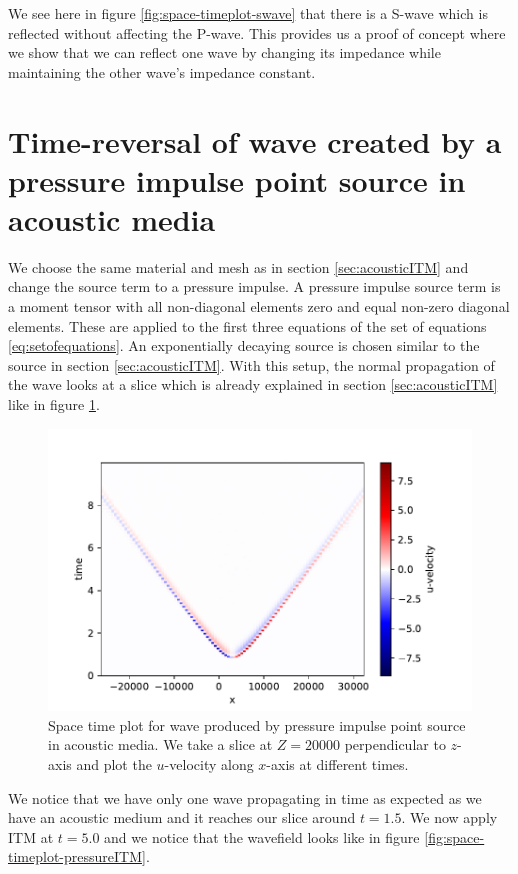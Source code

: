 We see here in figure \ref{fig:space-timeplot-swave} that there is a S-wave which is reflected without affecting the P-wave. 
This provides us a proof of concept where we show that we can reflect one wave by changing its impedance while maintaining the other wave's impedance constant.

\section{Time-reversal of wave created by a pressure impulse point source in acoustic media}\label{sec:pressureimpulse}
We choose the same material and mesh as in section \ref{sec:acousticITM} and change the source term to a pressure impulse. A pressure impulse source term is a moment tensor
with all non-diagonal elements zero and equal non-zero diagonal elements. These are applied to the first three equations of the set of equations \ref{eq:setofequations}. 
An exponentially decaying source is chosen similar to the source in section \ref{sec:acousticITM}. With this setup, the normal propagation of the wave looks at a slice which is already explained in section \ref{sec:acousticITM}
like in figure \ref{fig:space-timeplot-pressurenoITM}.

\begin{figure}[!htpb]
    \centering
    \includegraphics[width=0.75\linewidth]{figures/pressureimpulsewave-noITM.pdf}
    \caption{Space time plot for wave produced by pressure impulse point source in acoustic media. We take a slice at $Z=20000$ perpendicular to $z$-axis and plot the
    $u$-velocity along $x$-axis at different times.}
    \label{fig:space-timeplot-pressurenoITM}
\end{figure}

We notice that we have only one wave propagating in time as expected as we have an acoustic medium and it reaches our slice around $t=1.5$. We now apply \ac{ITM} at $t=5.0$ and we notice that the wavefield looks like in figure \ref{fig:space-timeplot-pressureITM}.

